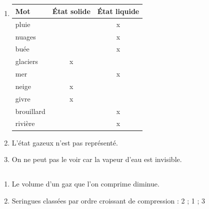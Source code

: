 \documentclass[12pt,a4paper]{article}
\begin{document}
\subsection*{}

\begin{enumerate}[label=\alph*)]
	\item 

\begin{tabular}{|l|c|c|}
	\hline
	\textbf{Mot}        & \textbf{\'Etat solide} & \textbf{\'Etat liquide} \\ \hline
	pluie      &               & x              \\ \hline
	nuages     &               & x              \\ \hline
	buée       &               & x              \\ \hline
	glaciers   & x             &                \\ \hline
	mer        &               & x              \\ \hline
	neige      & x             &                \\ \hline
	givre      & x             &                \\ \hline
	brouillard &               & x              \\ \hline
	rivière    &               & x             \\ \hline
\end{tabular}

\item L'état gazeux n'est pas représenté.
\item On ne peut pas le voir car la vapeur d'eau est invisible.

\end{enumerate}

\subsection*{}

\begin{enumerate}[label=\alph*)]
	\item Le volume d'un gaz que l'on comprime diminue.
	\item Seringues classées par ordre croissant de compression : 2 ; 1 ; 3
\end{enumerate}

\subsection*{}
\end{document}
